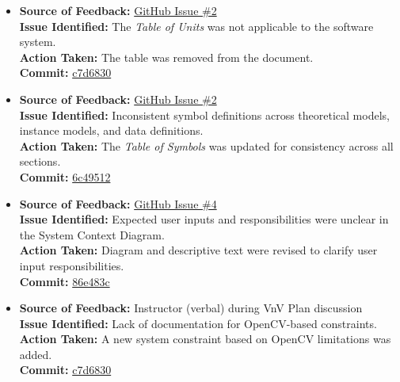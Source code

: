 \documentclass{article}
\begin{document}
\begin{itemize}

  \item \textbf{Source of Feedback:} \href{https://github.com/KiranSingh15/CAS-741-Image-Correspondences/issues/2}{GitHub Issue \#2} \\
  \textbf{Issue Identified:} The \textit{Table of Units} was not applicable to the software system. \\
  \textbf{Action Taken:} The table was removed from the document. \\
  \textbf{Commit:} \href{https://github.com/KiranSingh15/CAS-741-Image-Correspondences/commit/c7d683086b2546cf4bc67b98c30fa94f611fccd6}{c7d6830}
  
  \item \textbf{Source of Feedback:} \href{https://github.com/KiranSingh15/CAS-741-Image-Correspondences/issues/2}{GitHub Issue \#2} \\
  \textbf{Issue Identified:} Inconsistent symbol definitions across theoretical models, instance models, and data definitions. \\
  \textbf{Action Taken:} The \textit{Table of Symbols} was updated for consistency across all sections. \\
  \textbf{Commit:} \href{https://github.com/KiranSingh15/CAS-741-Image-Correspondences/commit/6c49512d687fb1ed972857dcae2e2e3c98af7696}{6c49512}

  \item \textbf{Source of Feedback:} \href{https://github.com/KiranSingh15/CAS-741-Image-Correspondences/issues/4}{GitHub Issue \#4} \\
  \textbf{Issue Identified:} Expected user inputs and responsibilities were unclear in the System Context Diagram. \\
  \textbf{Action Taken:} Diagram and descriptive text were revised to clarify user input responsibilities. \\
  \textbf{Commit:} \href{https://github.com/KiranSingh15/CAS-741-Image-Correspondences/commit/86e483c95394842de27e286edfe601c2bcebc5bb}{86e483c}

  \item \textbf{Source of Feedback:} Instructor (verbal) during VnV Plan discussion \\
  \textbf{Issue Identified:} Lack of documentation for OpenCV-based constraints. \\
  \textbf{Action Taken:} A new system constraint based on OpenCV limitations was added. \\
  \textbf{Commit:} \href{https://github.com/KiranSingh15/CAS-741-Image-Correspondences/commit/c7d683086b2546cf4bc67b98c30fa94f611fccd6}{c7d6830}


\end{itemize}
\end{document}
